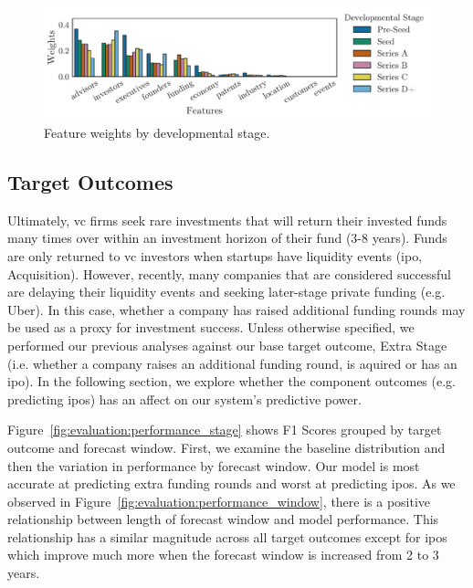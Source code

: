 \documentclass[../thesis/thesis.tex]{subfiles}
\begin{document}
\begin{figure}[!htb]
    \centering
    \includegraphics[width=\textwidth]{../figures/evaluation/features_stage}
    \caption[Feature weights by developmental stage]{Feature weights by developmental stage.}
    \label{fig:evaluation:features_stage}
\end{figure}

\subsection{Target Outcomes}

Ultimately, \gls{vc} firms seek rare investments that will return their invested funds many times over within an investment horizon of their fund (3-8 years). Funds are only returned to \gls{vc} investors when startups have liquidity events (\gls{ipo}, Acquisition). However, recently, many companies that are considered successful are delaying their liquidity events and seeking later-stage private funding (e.g. Uber). In this case, whether a company has raised additional funding rounds may be used as a proxy for investment success. Unless otherwise specified, we performed our previous analyses against our base target outcome, Extra Stage (i.e. whether a company raises an additional funding round, is aquired or has an \gls{ipo}). In the following section, we explore whether the component outcomes (e.g. predicting \gls{ipo}s) has an affect on our system's predictive power.

Figure~\ref{fig:evaluation:performance_stage} shows F1 Scores grouped by target outcome and forecast window. First, we examine the baseline distribution and then the variation in performance by forecast window. Our model is most accurate at predicting extra funding rounds and worst at predicting \gls{ipo}s. As we observed in Figure~\ref{fig:evaluation:performance_window}, there is a positive relationship between length of forecast window and model performance. This relationship has a similar magnitude across all target outcomes except for \gls{ipo}s which improve much more when the forecast window is increased from 2 to 3 years.
\end{document}
